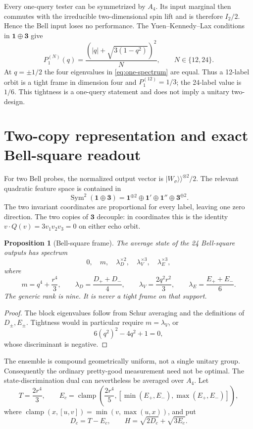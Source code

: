\documentclass[11pt]{article}
\newtheorem{proposition}[theorem]{Proposition}
\theoremstyle{definition}
\DeclareMathOperator{\clamp}{clamp}
\begin{document}
Every one-query tester can be symmetrized by $A_4$.  Its input marginal then
commutes with the irreducible two-dimensional spin lift and is therefore
$I_2/2$.  Hence the Bell input loses no performance.  The
Yuen--Kennedy--Lax conditions~\cite{yuen1975} in
$\mathbf1\oplus\mathbf3$ give
\begin{equation}\label{eq:oneuse}
 P_1^{(N)}(q)=
 \frac{\left(|q|+\sqrt{3(1-q^2)}\right)^2}{N},
 \qquad N\in\{12,24\}.
\end{equation}
At $q=\pm1/2$ the four eigenvalues in \cref{eq:one-spectrum} are equal.
Thus a 12-label orbit is a tight frame in dimension four and $P_1^{(12)}=1/3$;
the 24-label value is $1/6$.  This tightness is a one-query statement and does
not imply a unitary two-design.

\section{Two-copy representation and exact Bell-square readout}

For two Bell probes, the normalized output vector is
$\lvert W_\sigma\rangle\!\rangle^{\otimes2}/2$.  The relevant quadratic feature
space is contained in
\[
 \operatorname{Sym}^2(\mathbf1\oplus\mathbf3)
 =\mathbf1^{\oplus2}\oplus\mathbf1'\oplus\mathbf1''
  \oplus\mathbf3^{\oplus2}.
\]
The two invariant coordinates are proportional for every label, leaving one
zero direction.  The two copies of $\mathbf3$ decouple: in coordinates this
is the identity $v\cdot Q(v)=3v_1v_2v_3=0$ on either echo orbit.

\begin{proposition}[Bell-square frame]\label{prop:bellframe}
The average state of the 24 Bell-square outputs has spectrum
\[
 0,\quad m,\quad \lambda_D^{\times2},\quad
 \lambda_V^{\times3},\quad\lambda_E^{\times3},
\]
where
\[
 m=q^4+\frac{r^4}{3},\qquad
 \lambda_D=\frac{D_++D_-}{4},\qquad
 \lambda_V=\frac{2q^2r^2}{3},\qquad
 \lambda_E=\frac{E_++E_-}{6}.
\]
The generic rank is nine.  It is never a tight frame on that support.
\end{proposition}

\begin{proof}
The block eigenvalues follow from Schur averaging and the definitions of
$D_\pm,E_\pm$.  Tightness would in particular require $m=\lambda_V$, or
\[
 6(q^2)^2-4q^2+1=0,
\]
whose discriminant is negative.
\end{proof}

The ensemble is compound geometrically uniform, not a single unitary group.
Consequently the ordinary pretty-good measurement need not be optimal.  The
state-discrimination dual can nevertheless be averaged over $A_4$.  Let
\[
 T=\frac{2r^4}{3},\qquad
 E_c=\clamp\!\left(\frac{2r^4}{5},
 [\min(E_+,E_-),\max(E_+,E_-)]\right),
\]
where $\clamp(x,[u,v])=\min(v,\max(u,x))$, and put
\[
 D_c=T-E_c,\qquad H=\sqrt{2D_c}+\sqrt{3E_c}.
\]
\end{document}
